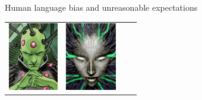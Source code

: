 \documentclass[xcolor={usenames,svgnames,x11names,dvipsnames,table}]{beamer}
\begin{document}
\begin{frame}{Human language bias and unreasonable expectations}
\begin{center}
\begin{tabular}{cccc}
            \includegraphics[height=8em]{./img/brainiac} &
            \includegraphics[height=8em]{./img/shodan}
        \end{tabular}
    \end{center}
\end{frame}
\end{document}
